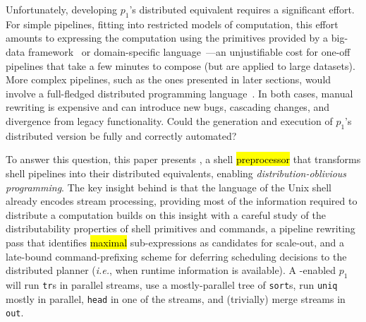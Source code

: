 \documentclass[sigplan,10pt,review,anonymous]{acmart}
\newcommand{\eg}{{\em e.g.}, }
\newcommand{\ie}{{\em i.e.}, }
\newcommand{\ttt}[1]{\texttt{\small #1}}
\newcommand{\todo}[1]{\hl{#1}\xspace}
\newcommand{\kk}[1]{[{\color{magenta}#1 --- kk}]}
\begin{document}
Unfortunately, developing $p_1$'s distributed equivalent requires a significant effort.
For simple pipelines, fitting into restricted models of computation, this effort amounts to expressing the computation using the primitives provided by a big-data framework~\cite{mapreduce:08, ciel:11, spark:12, naiad:13} or domain-specific language~\cite{alvaro2011consistency, distal:13, meiklejohn2015lasp}---an unjustifiable cost for one-off pipelines that take a few minutes to compose (but are applied to large datasets).
More complex pipelines, such as the ones presented in later sections, would involve a full-fledged distributed programming language~\cite{erlang:96, lopes1997d, acute:05, mace:07, cloudhaskell:11, ScalaLoci:18}. %
In both cases, manual rewriting is expensive and can introduce new bugs, cascading changes, and divergence from legacy functionality.
Could the generation and execution of $p_1$'s distributed version be fully and correctly automated?

To answer this question, this paper presents \sys, a shell \todo{preprocessor} that transforms shell pipelines into their distributed equivalents, enabling \emph{distribution-oblivious programming}.
The key insight behind \sys is that the language of the Unix shell already encodes stream processing, providing most of the information required to distribute a computation
\sys builds on this insight with a careful study of the distributability properties of shell primitives and commands, a pipeline rewriting pass that identifies \todo{maximal} sub-expressions as candidates for scale-out, and a late-bound command-prefixing scheme for deferring scheduling decisions to the distributed planner (\ie when runtime information is available).
A \sys-enabled $p_1$ will run \ttt{tr}s in parallel streams,
  use a mostly-parallel tree of \ttt{sort}s,
  run \ttt{uniq} mostly in parallel,
  \ttt{head} in one of the streams,
  and (trivially) merge streams in \ttt{out}.
\end{document}
